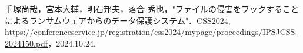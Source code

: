 \item 手塚尚哉，宮本大輔，明石邦夫，落合 秀也，"ファイルの侵害をフックすることによるランサムウェアからのデータ保護システム"．CSS2024,
\url{https://conferenceservice.jp/registration/css2024/mypage/proceedings/IPSJCSS-2024150.pdf}，2024.10.24.
